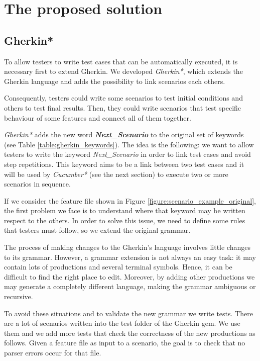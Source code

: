 \chapter{The proposed solution}

\section{Gherkin*}

To allow testers to write test cases that can be automatically executed, it is necessary first to extend Gherkin. We developed \textit{Gherkin*}, which extends the Gherkin language and adds the possibility to link scenarios each others.

Consequently, testers could write some scenarios to test initial conditions and others to test final results. Then, they could write scenarios that test specific behaviour of some features and connect all of them together.

\textit{Gherkin*} adds the new word \textbf{\textit{Next\_Scenario}} to the original set of keywords (see Table \ref{table:gherkin_keywords}). The idea is the following: we want to allow testers to write the keyword \textit{Next\_Scenario} in order to link test cases and avoid step repetitions. This keyword aims to be a link between two test cases and it will be used by \textit{Cucumber*} (see the next section) to execute two or more scenarios in sequence.

If we consider the feature file shown in Figure \ref{figure:scenario_example_original}, the first problem we face is to understand where that keyword may be written respect to the others. In order to solve this issue, we need to define some rules that testers must follow, so we extend the original grammar.

The process of making changes to the Gherkin's language involves little changes to its grammar. However, a grammar extension is not always an easy task: it may contain lots of productions and several terminal symbols. Hence, it can be difficult to find the right place to edit. Moreover, by adding other productions we may generate a completely different language, making the grammar ambiguous or recursive.

To avoid these situations and to validate the new grammar we write tests. There are a lot of scenarios written into the test folder of the Gherkin gem. We use them and we add more tests that check the correctness of the new productions as follows. Given a feature file as input to a scenario, the goal is to check that no parser errors occur for that file.

